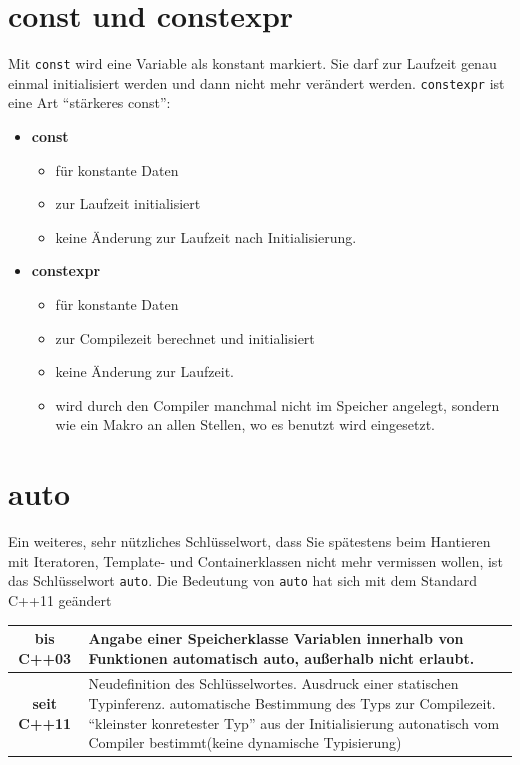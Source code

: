 \documentclass[a4paper]{report}
\begin{document}
\section{const und constexpr}
Mit \texttt{const} wird eine Variable als konstant markiert. Sie darf zur Laufzeit genau einmal initialisiert werden und dann nicht mehr verändert werden. \texttt{constexpr} ist eine Art "`stärkeres const"':

\begin{itemize}
	\item \textbf{const}
	\begin{itemize}
		\item für konstante Daten
		\item zur Laufzeit initialisiert
		\item keine Änderung zur Laufzeit nach Initialisierung.
	\end{itemize}
	\item \textbf{constexpr}
	\begin{itemize}
		\item für konstante Daten
		\item zur Compilezeit berechnet und initialisiert
		\item keine Änderung zur Laufzeit.
		\item wird durch den Compiler manchmal nicht im Speicher angelegt, sondern wie ein Makro an allen Stellen, wo es benutzt wird eingesetzt.
	\end{itemize}
\end{itemize}

\section{auto}
Ein weiteres, sehr nützliches Schlüsselwort, dass Sie spätestens beim Hantieren mit Iteratoren, Template- und Containerklassen nicht mehr vermissen wollen, ist das Schlüsselwort \texttt{auto}. Die Bedeutung von \texttt{auto} hat sich mit dem Standard C++11 geändert

\begin{center}
	\begin{tabular}{|c|p{12cm}|}
		\hline
		\textbf{bis C++03} & Angabe einer Speicherklasse \newline Variablen innerhalb von Funktionen automatisch auto, außerhalb nicht erlaubt. \\ \hline
		\textbf{seit C++11} & Neudefinition des Schlüsselwortes. \newline Ausdruck einer statischen Typinferenz. \newline automatische Bestimmung des Typs zur Compilezeit. \newline
		"`kleinster konretester Typ"' aus der Initialisierung autonatisch vom Compiler bestimmt\newline (keine dynamische Typisierung)\\ \hline
	\end{tabular}
\end{center}
\end{document}
